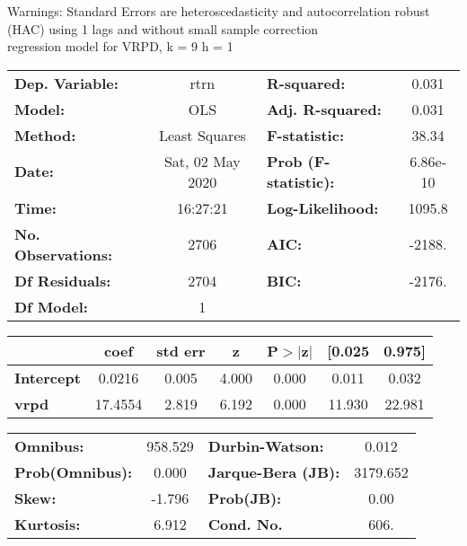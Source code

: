 Warnings: \newline
 [1] Standard Errors are heteroscedasticity and autocorrelation robust (HAC) using 1 lags and without small sample correction\\ 

regression model for VRPD, k = 9 h = 1\begin{center}
\begin{tabular}{lclc}
\toprule
\textbf{Dep. Variable:}    &       rtrn       & \textbf{  R-squared:         } &     0.031   \\
\textbf{Model:}            &       OLS        & \textbf{  Adj. R-squared:    } &     0.031   \\
\textbf{Method:}           &  Least Squares   & \textbf{  F-statistic:       } &     38.34   \\
\textbf{Date:}             & Sat, 02 May 2020 & \textbf{  Prob (F-statistic):} &  6.86e-10   \\
\textbf{Time:}             &     16:27:21     & \textbf{  Log-Likelihood:    } &    1095.8   \\
\textbf{No. Observations:} &        2706      & \textbf{  AIC:               } &    -2188.   \\
\textbf{Df Residuals:}     &        2704      & \textbf{  BIC:               } &    -2176.   \\
\textbf{Df Model:}         &           1      & \textbf{                     } &             \\
\bottomrule
\end{tabular}
\begin{tabular}{lcccccc}
                   & \textbf{coef} & \textbf{std err} & \textbf{z} & \textbf{P$> |$z$|$} & \textbf{[0.025} & \textbf{0.975]}  \\
\midrule
\textbf{Intercept} &       0.0216  &        0.005     &     4.000  &         0.000        &        0.011    &        0.032     \\
\textbf{vrpd}      &      17.4554  &        2.819     &     6.192  &         0.000        &       11.930    &       22.981     \\
\bottomrule
\end{tabular}
\begin{tabular}{lclc}
\textbf{Omnibus:}       & 958.529 & \textbf{  Durbin-Watson:     } &    0.012  \\
\textbf{Prob(Omnibus):} &   0.000 & \textbf{  Jarque-Bera (JB):  } & 3179.652  \\
\textbf{Skew:}          &  -1.796 & \textbf{  Prob(JB):          } &     0.00  \\
\textbf{Kurtosis:}      &   6.912 & \textbf{  Cond. No.          } &     606.  \\
\bottomrule
\end{tabular}
\end{center}


